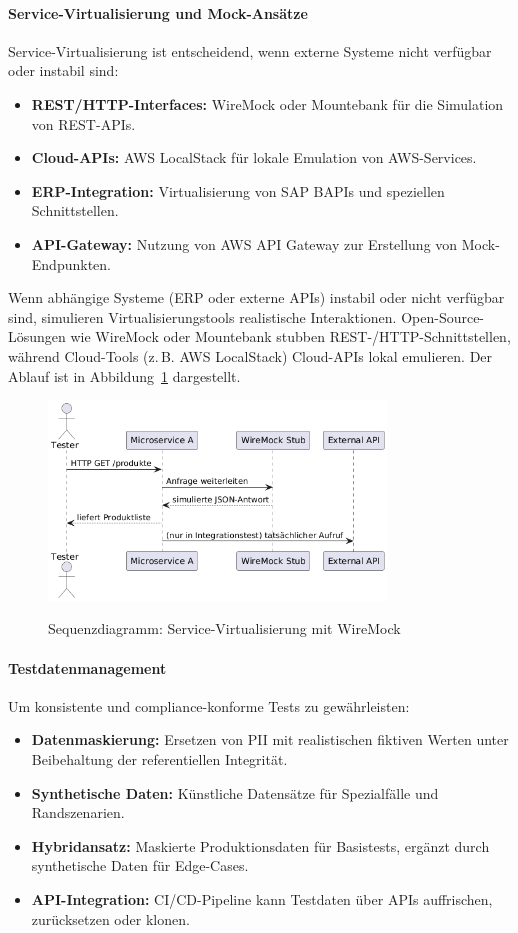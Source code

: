 \paragraph{Service-Virtualisierung und Mock-Ansätze}
Service-Virtualisierung ist entscheidend, wenn externe Systeme nicht verfügbar oder instabil sind:
\begin{itemize}
    \item \textbf{REST/HTTP-Interfaces:} WireMock oder Mountebank für die Simulation von REST-APIs.
    \item \textbf{Cloud-APIs:} AWS LocalStack für lokale Emulation von AWS-Services.
    \item \textbf{ERP-Integration:} Virtualisierung von SAP BAPIs und speziellen Schnittstellen.
    \item \textbf{API-Gateway:} Nutzung von AWS API Gateway zur Erstellung von Mock-Endpunkten.
\end{itemize}
Wenn abhängige Systeme (ERP oder externe APIs) instabil oder nicht verfügbar sind, simulieren Virtualisierungstools realistische Interaktionen. Open-Source-Lösungen wie WireMock oder Mountebank stubben REST-/HTTP-Schnittstellen, während Cloud-Tools (z.\,B. AWS LocalStack) Cloud-APIs lokal emulieren. Der Ablauf ist in Abbildung~\ref{fig:sequence} dargestellt.\begin{figure}[h!]
\centering
\caption{Sequenzdiagramm: Service-Virtualisierung mit WireMock}
    \includegraphics[width=0.8\textwidth]{fig/servicevirti.png}
    \label{fig:sequence}
\end{figure}

\newpage
\paragraph{Testdatenmanagement}
Um konsistente und compliance-konforme Tests zu gewährleisten:
\begin{itemize}
    \item \textbf{Datenmaskierung:} Ersetzen von PII mit realistischen fiktiven Werten unter Beibehaltung der referentiellen Integrität.
    \item \textbf{Synthetische Daten:} Künstliche Datensätze für Spezialfälle und Randszenarien.
    \item \textbf{Hybridansatz:} Maskierte Produktionsdaten für Basistests, ergänzt durch synthetische Daten für Edge-Cases.
    \item \textbf{API-Integration:} CI/CD-Pipeline kann Testdaten über APIs auffrischen, zurücksetzen oder klonen.
\end{itemize}
